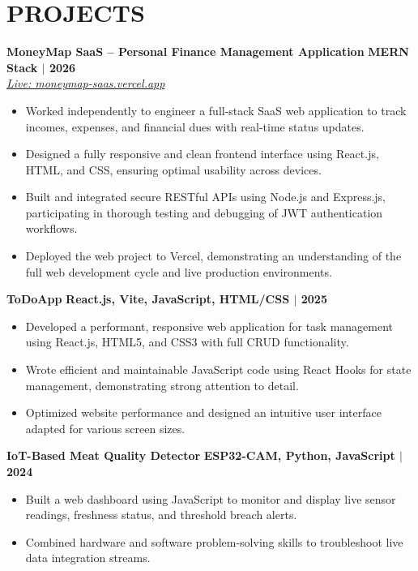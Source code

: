 \documentclass[a4paper,10pt]{article}
\begin{document}
\section*{PROJECTS}

\textbf{MoneyMap SaaS -- Personal Finance Management Application} \hfill \textbf{MERN Stack $|$ 2026}\\
\href{https://moneymap-saas.vercel.app}{\textit{Live: moneymap-saas.vercel.app}}
\begin{itemize}
    \item Worked independently to engineer a full-stack SaaS web application to track incomes, expenses, and financial dues with real-time status updates.
    \item Designed a fully responsive and clean frontend interface using React.js, HTML, and CSS, ensuring optimal usability across devices.
    \item Built and integrated secure RESTful APIs using Node.js and Express.js, participating in thorough testing and debugging of JWT authentication workflows.
    \item Deployed the web project to Vercel, demonstrating an understanding of the full web development cycle and live production environments.
\end{itemize}

\vspace{1pt}

\textbf{ToDoApp} \hfill \textbf{React.js, Vite, JavaScript, HTML/CSS $|$ 2025}
\begin{itemize}
    \item Developed a performant, responsive web application for task management using React.js, HTML5, and CSS3 with full CRUD functionality.
    \item Wrote efficient and maintainable JavaScript code using React Hooks for state management, demonstrating strong attention to detail.
    \item Optimized website performance and designed an intuitive user interface adapted for various screen sizes.
\end{itemize}

\vspace{1pt}

\textbf{IoT-Based Meat Quality Detector} \hfill \textbf{ESP32-CAM, Python, JavaScript $|$ 2024}
\begin{itemize}
    \item Built a web dashboard using JavaScript to monitor and display live sensor readings, freshness status, and threshold breach alerts.
    \item Combined hardware and software problem-solving skills to troubleshoot live data integration streams.
\end{itemize}
\end{document}
